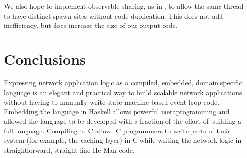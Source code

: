 \documentclass[preprint]{sigplanconf}
\begin{document}
We also hope to implement observable sharing, as in \cite{Gill}, to allow the
same thread to have distinct spawn sites without code duplication. This does not
add inefficiency, but does increase the size of our output code. 

\section{Conclusions}
Expressing network application logic as a compiled, embedded, domain
specific language is an elegant and practical way to build scalable
network applications without having to manually write state-machine
based event-loop code. Embedding the language in Haskell allows
powerful metaprogramming and allowed the language to be developed with
a fraction of the effort of building a full language. Compiling to C
allows C programmers to write parts of their system (for example, the
caching layer) in C while writing the network logic in
straightforward, straight-line He-Man code.


{}

\end{document}
